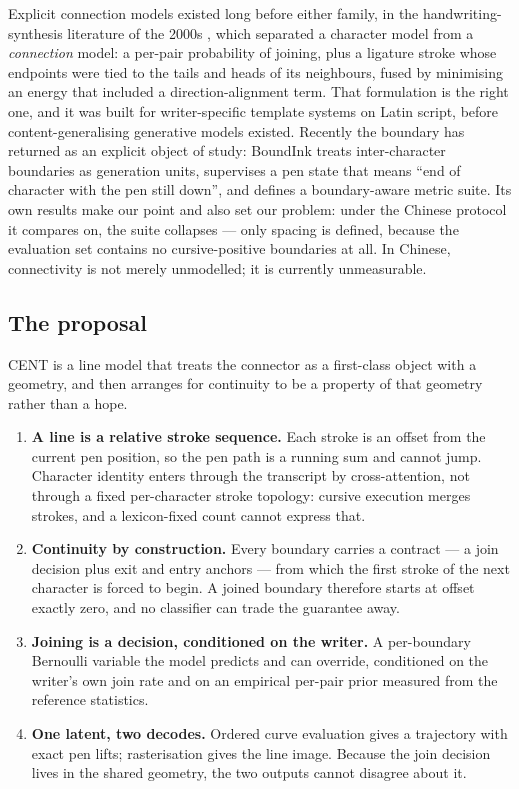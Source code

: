 \documentclass[conference]{IEEEtran}
\begin{document}
Explicit connection models existed long before either family, in the handwriting-synthesis
literature of the 2000s \cite{lin2007,wang2005,chen2015}, which separated a character model
from a \emph{connection} model: a per-pair probability of joining, plus a ligature stroke
whose endpoints were tied to the tails and heads of its neighbours, fused by minimising an
energy that included a direction-alignment term. That formulation is the right one, and it
was built for writer-specific template systems on Latin script, before content-generalising
generative models existed. Recently the boundary has returned as an explicit object of study:
BoundInk \cite{boundink} treats inter-character boundaries as generation units, supervises a
pen state that means ``end of character with the pen still down'', and defines a boundary-aware
metric suite. Its own results make our point and also set our problem: under the Chinese
protocol it compares on, the suite collapses --- only spacing is defined, because the
evaluation set contains no cursive-positive boundaries at all. In Chinese, connectivity is
not merely unmodelled; it is currently unmeasurable.

\subsection{The proposal}
CENT is a line model that treats the connector as a first-class object with a geometry, and
then arranges for continuity to be a property of that geometry rather than a hope.

\begin{enumerate}
\item \textbf{A line is a relative stroke sequence.} Each stroke is an offset from the current
pen position, so the pen path is a running sum and cannot jump. Character identity enters
through the transcript by cross-attention, not through a fixed per-character stroke topology:
cursive execution merges strokes, and a lexicon-fixed count cannot express that.
\item \textbf{Continuity by construction.} Every boundary carries a contract --- a join decision
plus exit and entry anchors --- from which the first stroke of the next character is forced to
begin. A joined boundary therefore starts at offset exactly zero, and no classifier can trade
the guarantee away.
\item \textbf{Joining is a decision, conditioned on the writer.} A per-boundary Bernoulli
variable the model predicts and can override, conditioned on the writer's own join rate and on
an empirical per-pair prior measured from the reference statistics.
\item \textbf{One latent, two decodes.} Ordered curve evaluation gives a trajectory with exact
pen lifts; rasterisation gives the line image. Because the join decision lives in the shared
geometry, the two outputs cannot disagree about it.
\end{enumerate}
\end{document}
